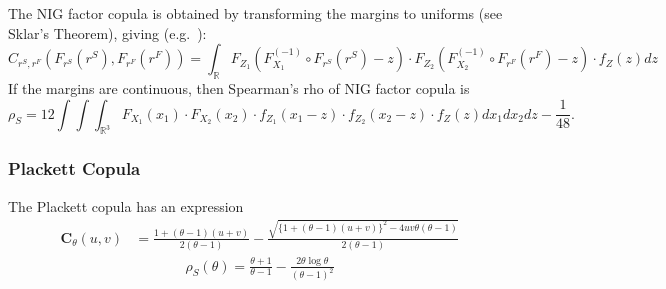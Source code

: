 The NIG factor copula is obtained by transforming the margins to
uniforms (see Sklar's Theorem), giving (e.g.\
\citep{krupskii2013factor}):
\begin{equation*}
  C_{r^S, r^F}(F_{r^S}(r^S), F_{r^F}(r^F)) = \int_\mathbb{R}
  F_{Z_1}(F_{X_1}^{(-1)} \circ F_{r^S}(r^S) -z) \cdot
  F_{Z_2}(F_{X_2}^{(-1)} \circ F_{r^F}(r^F) -z) \cdot
  f_Z(z) dz
  \end{equation*}
If the margins are continuous, then Spearman's rho of NIG factor
copula is 
\begin{equation*}
  \rho_S = 12 \int \int \int_{\mathbb{R}^3}
  F_{X_1}(x_1) \cdot
  F_{X_2}(x_2) \cdot
  f_{Z_1}(x_1-z) \cdot
  f_{Z_2}(x_2-z) \cdot
  f_Z(z) dx_1 dx_2 dz - \frac{1}{48}.
  \end{equation*}



\subsubsection{Plackett Copula}\label{subsec:other-copula}
The Plackett copula has an expression
\begin{align}
    \bm{C}_{\theta}(u,v) &= \frac{1+(\theta-1)(u+v)}{2(\theta-1)}
                         - \frac{\sqrt{\{
    1+(\theta-1)(u+v)\}^2 - 4uv\theta(\theta-1)}}{2(\theta-1)}
    \end{align}
\begin{align}
    \rho_S(\theta) = \frac{\theta+1}{\theta-1} - \frac{2\theta \log \theta}{(\theta-1)^2}
    \end{align}\medskip

